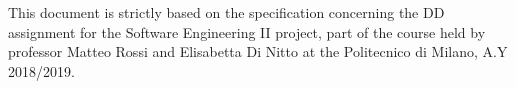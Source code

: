 This document is strictly based on the specification concerning the DD assignment for the Software Engineering II project, part of the course held by professor Matteo Rossi and Elisabetta Di Nitto at the Politecnico di Milano, A.Y 2018/2019.